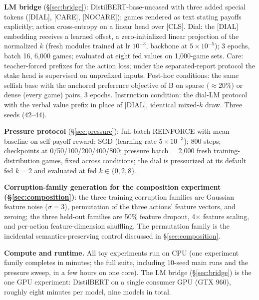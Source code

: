 \documentclass[11pt]{article}
\begin{document}
\textbf{LM bridge} (\S\ref{sec:bridge}): DistilBERT-base-uncased with three added special
tokens ([DIAL], [CARE], [NOCARE]); games rendered as text stating payoffs explicitly;
action cross-entropy on a linear head over [CLS]. Dial: the [DIAL] embedding receives a
learned offset, a zero-initialized linear projection of the normalized $k$ (fresh modules
trained at lr $10^{-3}$, backbone at $5{\times}10^{-5}$); 3 epochs, batch 16, 6{,}000
games; evaluated at eight fed values on 1{,}000-game sets. Care: teacher-forced prefixes
for the action loss; under the separated-report protocol the stake head is supervised on
unprefixed inputs. Post-hoc conditions: the same selfish base with the anchored preference objective of B on sparse ($\approx$20\%) or dense (every game) pairs, 3 epochs. Instruction condition: the dial-LM protocol with the verbal value prefix in place of [DIAL], identical mixed-$k$ draw. Three seeds (42--44).

\textbf{Pressure protocol} (\S\ref{sec:pressure}): full-batch REINFORCE with mean baseline on
self-payoff reward; SGD (learning rate $5\times10^{-3}$); 800 steps; checkpoints at
0/50/100/200/400/800; pressure batch = 2{,}000 fresh training-distribution games, fixed across
conditions; the dial is pressurized at its default fed $k{=}2$ and evaluated at fed
$k \in \{0, 2, 8\}$.

\textbf{Corruption-family generation for the composition experiment (\S\ref{sec:composition})}: the three training
corruption families are Gaussian feature noise ($\sigma{=}3$), permutation of the three
actions' feature vectors, and zeroing; the three held-out families are 50\% feature dropout,
4$\times$ feature scaling, and per-action feature-dimension shuffling. The permutation family
is the incidental semantics-preserving control discussed in \S\ref{sec:composition}.

\textbf{Compute and runtime.} All toy experiments run on CPU (one experiment family completes in
minutes; the full suite, including 10-seed main runs and the pressure sweep, in a few hours on
one core). The LM bridge (\S\ref{sec:bridge}) is the one GPU experiment: DistilBERT on a single
consumer GPU (GTX 960), roughly eight minutes per model, nine models in total.
\end{document}
